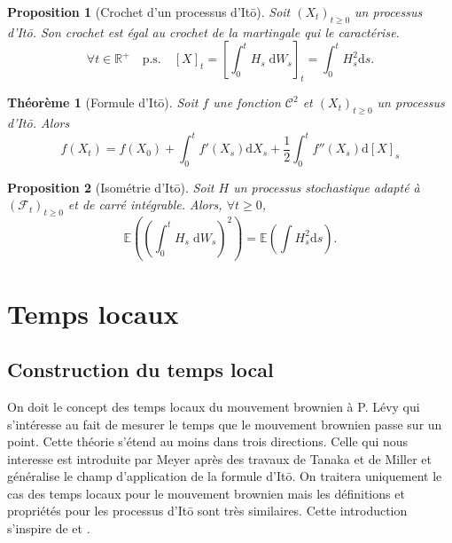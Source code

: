 \documentclass[openany]{book}
\newcommand{\F}{\mathscr{F}}
\newcommand{\R}{\mathbb{R}}
\newcommand{\E}{\mathbb{E}}
\newcommand{\1}{\mathbbm{1}}
\renewcommand{\d}{\mathrm{d}}
\theoremstyle{thmfont}
\newtheorem{theorem}{Théorème}[chapter]
\theoremstyle{deffont}
\theoremstyle{thmfont}
\newtheorem{prop}[prop]{Proposition}
\theoremstyle{deffont}
\begin{document}
 \begin{prop}[Crochet d'un processus d'Itō] Soit $(X_t)_{t\geq0}$ un processus d'Itō. Son crochet est égal au crochet de la martingale qui le caractérise.
   $$\forall t \in  \R^+ \quad\text{p.s.}\quad [X]_t = \left[\int_0^tH_s \;\d W_s\right]_t = \int_0^t H_s^2 \d s.$$
  \end{prop}

  \begin{theorem}[Formule d'Itō]
  Soit $f$ une fonction $\mathcal C^2$ et $(X_t)_{t\geq0}$ un processus d'Itō. Alors
  \begin{equation}
    f(X_t) = f(X_0) + \int_0^t f'(X_s) \d X_s + \dfrac{1}{2} \int_0^t f''(X_s) \d[X]_s
  \end{equation}
  \end{theorem}

\begin{prop}[Isométrie d'Itō] Soit $H$ un processus stochastique adapté à $(\F_t)_{t\geq0}$ et de carré intégrable. Alors, $\forall t \geq 0$,
  \begin{equation}
    \E\left( \left(\int_0^t H_s \;\d W_s\right)^2\right) = \E\left( \int H_s^2 \d s\right).
  \end{equation}
  

  \end{prop}
\chapter{Temps locaux}

\section{Construction du temps local}\label{sec:ConstrTempsLoc}

On doit le concept des temps locaux du mouvement brownien à P. Lévy qui s’intéresse au fait de mesurer le temps que le mouvement brownien passe sur un point. Cette théorie s'étend au moins dans trois directions.
Celle qui nous interesse est introduite par Meyer après des travaux de Tanaka et de Miller et généralise le champ d'application de la formule d'Itō. On traitera uniquement le cas des temps locaux pour le mouvement brownien mais les définitions et propriétés pour les processus d'Itō sont très similaires. Cette introduction s'inspire de \cite{revuz-yor} et \cite{almostsure}.\\
\end{document}
